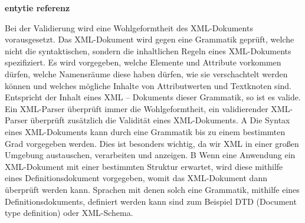 \textbf{entytie referenz}

Bei der Validierung wird eine Wohlgeformtheit des XML-Dokuments vorausgesetzt. Das XML-Dokument wird gegen eine Grammatik geprüft, welche nicht die syntaktischen, sondern die inhaltlichen Regeln eines XML-Dokuments spezifiziert. Es wird vorgegeben, welche Elemente und Attribute vorkommen dürfen, welche Namensräume diese haben dürfen, wie sie verschachtelt werden können und welches mögliche Inhalte von Attributwerten und Textknoten sind. Entspricht der Inhalt eines XML – Dokuments dieser Grammatik, so ist es valide. Ein XML-Parser überprüft immer die Wohlgeformtheit, ein validierender XML-Parser überprüft zusätzlich die Validität eines XML-Dokuments. A
Die Syntax eines XML-Dokuments kann durch eine Grammatik bis zu einem bestimmten Grad vorgegeben werden. Dies ist besonders wichtig, da wir XML in einer großen Umgebung austauschen, verarbeiten und anzeigen. B Wenn eine Anwendung ein XML-Dokument mit einer bestimmten Struktur erwartet, wird diese mithilfe eines Definitionsdokument vorgegeben, womit das XML-Dokument dann überprüft werden kann.
Sprachen mit denen solch eine Grammatik, mithilfe eines Definitionsdokuments, definiert werden kann sind zum Beispiel DTD (Document type definition) oder XML-Schema.

